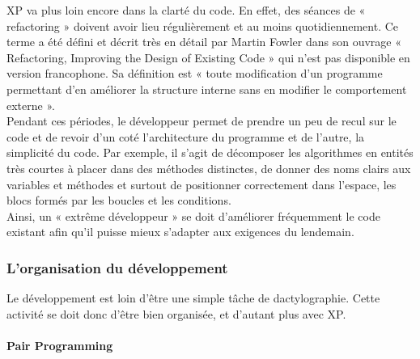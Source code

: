 \documentclass[]{article}
\let\oldparagraph\paragraph
\renewcommand{\paragraph}[1]{\oldparagraph{#1}\mbox{}}
\begin{document}
XP va plus loin encore dans la clarté du code. En effet, des séances de
« refactoring » doivent avoir lieu régulièrement et au moins
quotidiennement. Ce terme a été défini et décrit très en détail par
Martin Fowler dans son ouvrage « Refactoring, Improving the Design of
Existing Code » qui n'est pas disponible en version francophone. Sa
définition est « toute modification d'un programme permettant d'en
améliorer la structure interne sans en modifier le comportement externe
».\\
Pendant ces périodes, le développeur permet de prendre un peu de recul
sur le code et de revoir d'un coté l'architecture du programme et de
l'autre, la simplicité du code. Par exemple, il s'agit de décomposer les
algorithmes en entités très courtes à placer dans des méthodes
distinctes, de donner des noms clairs aux variables et méthodes et
surtout de positionner correctement dans l'espace, les blocs formés par
les boucles et les conditions.\\
Ainsi, un « extrême développeur » se doit d'améliorer fréquemment le
code existant afin qu'il puisse mieux s'adapter aux exigences du
lendemain.~




\hypertarget{lorganisation-du-duxe9veloppement}{%
\subsubsection{L'organisation du
développement}\label{lorganisation-du-duxe9veloppement}}

Le développement est loin d'être une simple tâche de dactylographie.
Cette activité se doit donc d'être bien organisée, et d'autant plus avec
XP.




\hypertarget{pair-programming}{%
\paragraph{Pair Programming}\label{pair-programming}}
\end{document}
